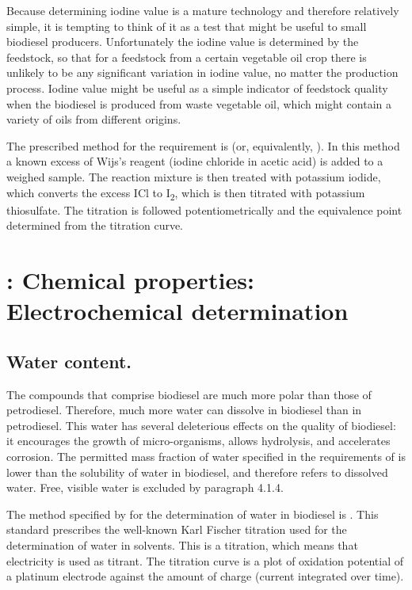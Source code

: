 Because determining iodine value is a mature technology and therefore relatively
simple, it is tempting to think of it as a test that might be useful to small
biodiesel producers. Unfortunately the iodine value is determined by the
feedstock, so that for a feedstock from a certain vegetable oil crop there is
unlikely to be any significant variation in iodine value, no matter the
production process. Iodine value might be useful as a simple indicator of
feedstock quality when the biodiesel is produced from waste vegetable oil, which
might contain a variety of oils from different origins.

The prescribed method for the requirement is  (or, equivalently,
). In this method a known excess of Wijs's reagent (iodine
chloride in acetic acid) is added to a weighed sample. The reaction mixture is
then treated with potassium iodide, which converts the excess ICl to
I\textsubscript{2}, which is then titrated with potassium thiosulfate. The
titration is followed potentiometrically and the equivalence point determined
from the titration curve.

\section{: Chemical properties: Electrochemical determination}

\subsection{Water content.}

The compounds that comprise biodiesel are much more polar than those of
petro\-diesel. Therefore, much more water can dissolve in biodiesel than in
petrodiesel. This water has several deleterious effects on the quality of
biodiesel: it encourages the growth of micro-organisms, allows hydrolysis, and
accelerates corrosion. The permitted mass fraction of water specified in the
requirements of  is lower than the solubility of water in
biodiesel, and therefore refers to dissolved water. Free, visible water is
excluded by paragraph 4.1.4.

The method specified by  for the determination of water in
biodiesel is . This standard prescribes the well-known Karl
Fischer titration used for the determination of water in solvents. This is a
 titration, which means that electricity is used as
titrant. The titration curve is a plot of oxidation potential of a platinum
electrode against the amount of charge (current integrated over time).


